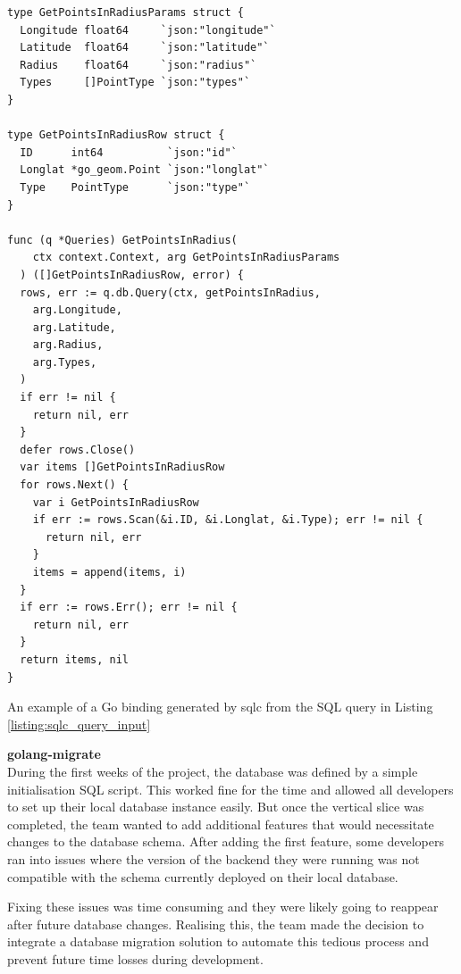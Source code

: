 \newpage{}

\begin{listing}[htbp]
  \centering{}
  \begin{minipage}{0.85\textwidth}
  \begin{verbatim}
type GetPointsInRadiusParams struct {
  Longitude float64     `json:"longitude"`
  Latitude  float64     `json:"latitude"`
  Radius    float64     `json:"radius"`
  Types     []PointType `json:"types"`
}

type GetPointsInRadiusRow struct {
  ID      int64          `json:"id"`
  Longlat *go_geom.Point `json:"longlat"`
  Type    PointType      `json:"type"`
}

func (q *Queries) GetPointsInRadius(
    ctx context.Context, arg GetPointsInRadiusParams
  ) ([]GetPointsInRadiusRow, error) {
  rows, err := q.db.Query(ctx, getPointsInRadius,
    arg.Longitude,
    arg.Latitude,
    arg.Radius,
    arg.Types,
  )
  if err != nil {
    return nil, err
  }
  defer rows.Close()
  var items []GetPointsInRadiusRow
  for rows.Next() {
    var i GetPointsInRadiusRow
    if err := rows.Scan(&i.ID, &i.Longlat, &i.Type); err != nil {
      return nil, err
    }
    items = append(items, i)
  }
  if err := rows.Err(); err != nil {
    return nil, err
  }
  return items, nil
}
  \end{verbatim}
  \end{minipage}
  \caption{An example of a Go binding generated by sqlc from the SQL query in
  Listing \ref{listing:sqlc_query_input}}
  \label{listing:sqlc_generated_bindings}
\end{listing}

\newpage{}

\textbf{golang-migrate}\\
During the first weeks of the project, the database was defined by a simple
initialisation SQL script. This worked fine for the time and allowed all
developers to set up their local database instance easily. But once the vertical
slice was completed, the team wanted to add additional features that would
necessitate changes to the database schema. After adding the first feature, some
developers ran into issues where the version of the backend they were running
was not compatible with the schema currently deployed on their local database.

Fixing these issues was time consuming and they were likely going to reappear
after future database changes. Realising this, the team made the decision to
integrate a database migration solution to automate this tedious process and
prevent future time losses during development.

